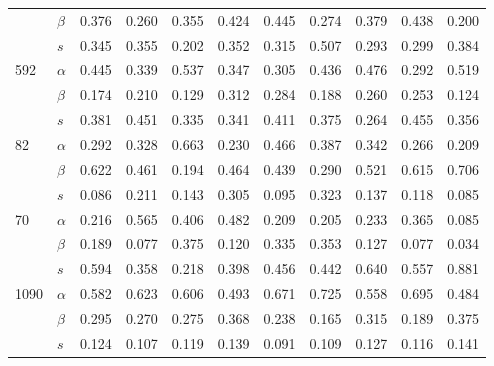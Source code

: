 \begin{longtable}{llrrrrrrrrr}
     & $\beta$ & 0.376 & 0.260 & 0.355 & 0.424 & 0.445 & 0.274 & 0.379 & 0.438 & 0.200 \\
     & $s$ & 0.345 & 0.355 & 0.202 & 0.352 & 0.315 & 0.507 & 0.293 & 0.299 & 0.384 \\
\cline{1-11}
\multirow{3}{*}{592} & $\alpha$ & 0.445 & 0.339 & 0.537 & 0.347 & 0.305 & 0.436 & 0.476 & 0.292 & 0.519 \\
     & $\beta$ & 0.174 & 0.210 & 0.129 & 0.312 & 0.284 & 0.188 & 0.260 & 0.253 & 0.124 \\
     & $s$ & 0.381 & 0.451 & 0.335 & 0.341 & 0.411 & 0.375 & 0.264 & 0.455 & 0.356 \\
\cline{1-11}
\multirow{3}{*}{82} & $\alpha$ & 0.292 & 0.328 & 0.663 & 0.230 & 0.466 & 0.387 & 0.342 & 0.266 & 0.209 \\
     & $\beta$ & 0.622 & 0.461 & 0.194 & 0.464 & 0.439 & 0.290 & 0.521 & 0.615 & 0.706 \\
     & $s$ & 0.086 & 0.211 & 0.143 & 0.305 & 0.095 & 0.323 & 0.137 & 0.118 & 0.085 \\
\cline{1-11}
\multirow{3}{*}{70} & $\alpha$ & 0.216 & 0.565 & 0.406 & 0.482 & 0.209 & 0.205 & 0.233 & 0.365 & 0.085 \\
     & $\beta$ & 0.189 & 0.077 & 0.375 & 0.120 & 0.335 & 0.353 & 0.127 & 0.077 & 0.034 \\
     & $s$ & 0.594 & 0.358 & 0.218 & 0.398 & 0.456 & 0.442 & 0.640 & 0.557 & 0.881 \\
\cline{1-11}
\multirow{3}{*}{1090} & $\alpha$ & 0.582 & 0.623 & 0.606 & 0.493 & 0.671 & 0.725 & 0.558 & 0.695 & 0.484 \\
     & $\beta$ & 0.295 & 0.270 & 0.275 & 0.368 & 0.238 & 0.165 & 0.315 & 0.189 & 0.375 \\
     & $s$ & 0.124 & 0.107 & 0.119 & 0.139 & 0.091 & 0.109 & 0.127 & 0.116 & 0.141 \\
\end{longtable}
